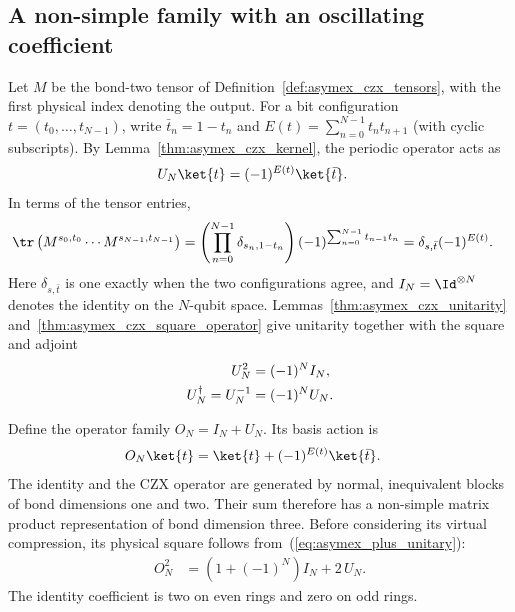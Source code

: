 \subsection{A non-simple family with an oscillating coefficient}%
\label{sec:asymex_czx_plus}

Let $M$ be the bond-two tensor of Definition~\ref{def:asymex_czx_tensors},
with the first physical index denoting the output. For a bit configuration
$t=(t_0,\ldots,t_{N-1})$, write $\bar t_n=1-t_n$ and
$E(t)=\sum_{n=0}^{N-1}t_nt_{n+1}$ (with cyclic subscripts).
By Lemma~\ref{thm:asymex_czx_kernel}, the periodic operator acts as
\begin{align}
    U_N\ket{t} & =(-1)^{E(t)}\ket{\bar t}.
    \label{eq:asymex_plus_basis}
\end{align}
In terms of the tensor entries,
\begin{align}
    \tr\left(M^{s_0,t_0}\cdots M^{s_{N-1},t_{N-1}}\right)
     & =\left(\prod_{n=0}^{N-1}\delta_{s_n,1-t_n}\right)
    (-1)^{\sum_{n=0}^{N-1}t_{n-1}t_n}
    =\delta_{s,\bar t}(-1)^{E(t)}.
    \label{eq:asymex_plus_kernel}
\end{align}
Here $\delta_{s,\bar t}$ is one exactly when the two configurations agree,
and $I_N=\Id^{\otimes N}$ denotes the identity on the $N$-qubit space.
Lemmas~\ref{thm:asymex_czx_unitarity}
and~\ref{thm:asymex_czx_square_operator} give unitarity together with the
square and adjoint
\begin{align}
    U_N^2                & =(-1)^NI_N,
    \label{eq:asymex_plus_unitary}     \\
    U_N^\dagger=U_N^{-1} & =(-1)^NU_N.
    \notag
\end{align}

Define the operator family $O_N=I_N+U_N$. Its basis action is
\begin{align}
    O_N\ket{t} & =\ket{t}+(-1)^{E(t)}\ket{\bar t}.
    \label{eq:asymex_plus_action}
\end{align}
The identity and the CZX operator are generated by normal, inequivalent
blocks of bond dimensions one and two. Their sum therefore has a
non-simple matrix product representation of bond dimension three.
Before considering its virtual compression, its physical square follows
from~(\ref{eq:asymex_plus_unitary}):
\begin{align}
    O_N^2 & =(1+(-1)^N)I_N+2\,U_N.
    \label{eq:asymex_czx_plus_square}
\end{align}
The identity coefficient is two on even rings and zero on odd rings.


